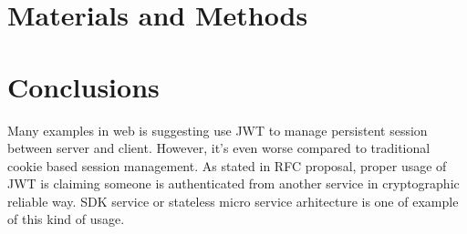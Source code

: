 \documentclass[journal,article,submit,moreauthors,pdftex,10pt,a4paper]{mdpi}
\begin{document}
\section{Materials and Methods}




\section{Conclusions}
Many examples in web is suggesting use JWT to manage persistent session between server and client. However, it's even worse compared to traditional cookie based session management. As stated in RFC proposal, proper usage of JWT is claiming someone is authenticated from another service in cryptographic reliable way. SDK service or stateless micro service arhitecture is one of example of this kind of usage.

\vspace{6pt} 

\end{document}
